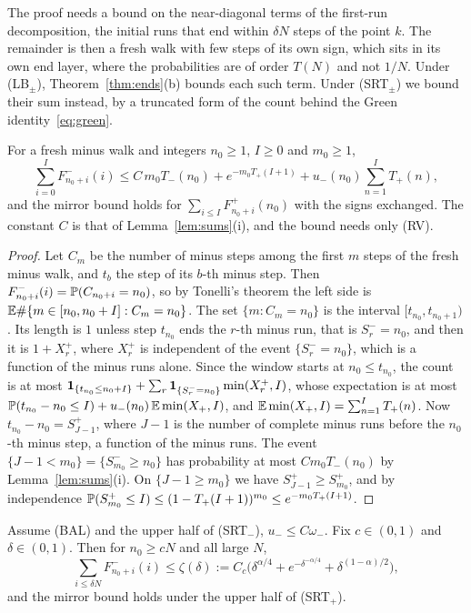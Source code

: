 The proof needs a bound on the near-diagonal terms of the first-run decomposition, the
initial runs that end within $\delta N$ steps of the point $k$. The remainder is then a
fresh walk with few steps of its own sign, which sits in its own end layer, where the
probabilities are of order $T(N)$ and not $1/N$. Under (LB$_\pm$), Theorem~\ref{thm:ends}(b)
bounds each such term. Under (SRT$_\pm$) we bound their sum instead, by a truncated form of
the count behind the Green identity~\eqref{eq:green}.

\begin{lemma}\label{lem:count}
For a fresh minus walk and integers $n_0\ge1$, $I\ge0$ and $m_0\ge1$,
\[
 \sum_{i=0}^{I}F^\minus_{n_0+i}(i)\le C\,m_0T_\minus(n_0)+e^{-m_0T_\plus(I+1)}+u_\minus(n_0)\sum_{n=1}^{I}T_\plus(n),
\]
and the mirror bound holds for $\sum_{i\le I}F^\plus_{n_0+i}(n_0)$ with the signs exchanged.
The constant $C$ is that of Lemma~\ref{lem:sums}(i), and the bound needs only (RV).
\end{lemma}

\begin{proof}
Let $C_m$ be the number of minus steps among the first $m$ steps of the fresh minus walk,
and $t_b$ the step of its $b$-th minus step. Then $F^{-}_{n_0+i}(i)=\mathbb{P}(C_{n_0+i}=n_0)$,
so by Tonelli's theorem the left side is $\mathbb{E}\#\{m\in[n_0,n_0+I]:C_m=n_0\}$. The set
$\{m:C_m=n_0\}$ is the interval $[t_{n_0},t_{n_0+1})$. Its length is $1$ unless step
$t_{n_0}$ ends the $r$-th minus run, that is $S^\minus_r=n_0$, and then it is $1+X^\plus_r$,
where $X^\plus_r$ is independent of the event $\{S^\minus_r=n_0\}$, which is a function of the
minus runs alone. Since the window starts at $n_0\le t_{n_0}$, the count is at most
$\mathbf{1}_{\{t_{n_0}\le n_0+I\}}+\sum_r\mathbf{1}_{\{S^{-}_r=n_0\}}\min(X^{+}_r,I)$, whose expectation is
at most $\mathbb{P}(t_{n_0}-n_0\le I)+u_{-}(n_0)\,\mathbb{E}\min(X_{+},I)$, and
$\mathbb{E}\min(X_{+},I)=\sum_{n=1}^IT_{+}(n)$. Now $t_{n_0}-n_0=S^\plus_{J-1}$, where $J-1$ is the
number of complete minus runs before the $n_0$-th minus step, a function of the minus runs.
The event $\{J-1<m_0\}=\{S^\minus_{m_0}\ge n_0\}$ has probability at most $Cm_0T_\minus(n_0)$
by Lemma~\ref{lem:sums}(i). On $\{J-1\ge m_0\}$ we have $S^\plus_{J-1}\ge S^\plus_{m_0}$, and by
independence $\mathbb{P}(S^{+}_{m_0}\le I)\le(1-T_{+}(I+1))^{m_0}\le e^{-m_0T_{+}(I+1)}$.
\end{proof}

\begin{corollary}\label{cor:count}
Assume (BAL) and the upper half of (SRT$_\minus$), $u_\minus\le C\omega_\minus$. Fix $c\in(0,1)$
and $\delta\in(0,1)$. Then for $n_0\ge cN$ and all large $N$,
\[
 \sum_{i\le\delta N}F^\minus_{n_0+i}(i)\le\zeta(\delta):=C_c\bigl(\delta^{\alpha/4}+e^{-\delta^{-\alpha/4}}+\delta^{(1-\alpha)/2}\bigr),
\]
and the mirror bound holds under the upper half of (SRT$_\plus$).
\end{corollary}

